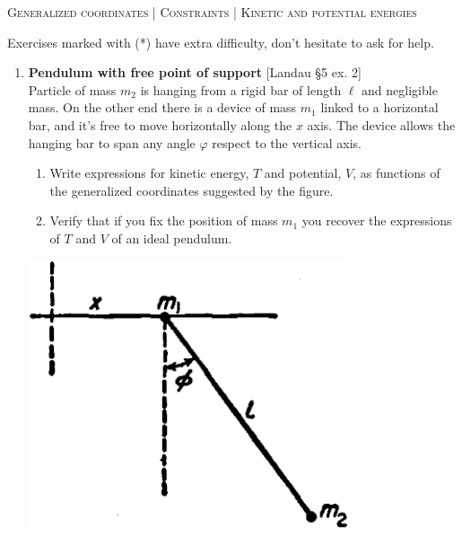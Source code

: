 \documentclass[11pt, a4paper, twoside]{article}
\begin{document}
\begin{center}
  \textsc{\large Generalized coordinates | Constraints | Kinetic and potential energies}
\end{center}
\noindent
Exercises marked with (*) have extra difficulty, don't hesitate to ask for help.

\begin{enumerate}

\item
	\begin{minipage}[t][5cm]{0.7\textwidth}
		\textbf{Pendulum with free point of support} [Landau \S5 ex. 2]\\
		Particle of mass $m_2$ is hanging from a rigid bar of length $\ell$ and negligible mass. On the other end there is a device of mass $m_1$ linked to a horizontal bar, and it's free to move horizontally along the $x$ axis. The device allows the hanging bar to span any angle $\varphi$ respect to the vertical axis. 
		\begin{enumerate}
			\item Write expressions for kinetic energy, $T$ and potential, $V$, as functions of the generalized coordinates suggested by the figure.
			\item Verify that if you fix the position of mass $m_1$ you recover the expressions of $T$ and $V$ of an ideal pendulum.
		\end{enumerate}
	\end{minipage}
	\begin{minipage}[c][1cm][t]{0.3\textwidth}
		\includegraphics[width=0.75\textwidth]{figures/landauS52_fig2.png}
	\end{minipage}




\end{enumerate}
\end{document}
